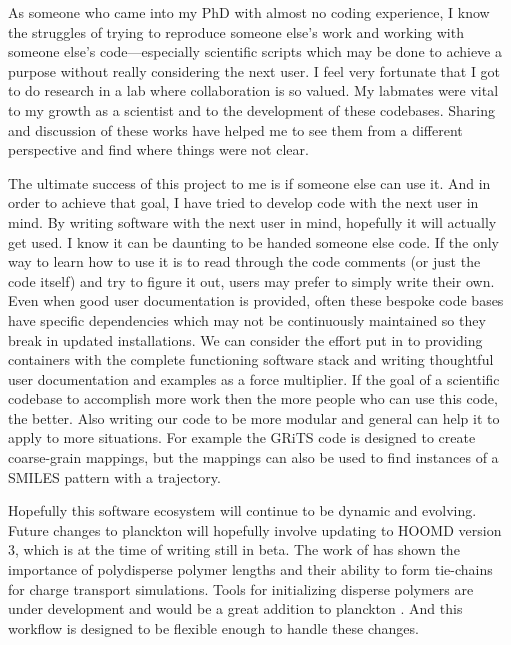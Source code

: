As someone who came into my PhD with almost no coding experience, I know the struggles of trying to reproduce someone else's work and working with someone else's code---especially scientific scripts which may be done to achieve a purpose without really considering the next user. I feel very fortunate that I got to do research in a lab where collaboration is so valued. My labmates were vital to my growth as a scientist and to the development of these codebases. 
Sharing and discussion of these works have helped me to see them from a different perspective and find where things were not clear.

The ultimate success of this project to me is if someone else can use it. 
And in order to achieve that goal, I have tried to develop code with the next user in mind.
By writing software with the next user in mind, hopefully it will actually get used. 
I know it can be daunting to be handed someone else code. If the only way to learn how to use it is to read through the code comments (or just the code itself) and try to figure it out, users may prefer to simply write their own. 
Even when good user documentation is provided, often these bespoke code bases have specific dependencies which may not be continuously maintained so they break in updated installations.
We can consider the effort put in to providing containers with the complete functioning software stack and writing thoughtful user documentation and examples as a force multiplier. 
If the goal of a scientific codebase to accomplish more work then the more people who can use this code, the better.
Also writing our code to be more modular and general can help it to apply to more situations. For example the GRiTS code is designed to create coarse-grain mappings, but the mappings can also be used to find instances of a SMILES pattern with a trajectory.

Hopefully this software ecosystem will continue to be dynamic and evolving. Future changes to planckton will hopefully involve updating to HOOMD version 3, which is at the time of writing still in beta. The work of \citet{Miller2018a} has shown the importance of polydisperse polymer lengths and their ability to form tie-chains for charge transport simulations. 
Tools for initializing disperse polymers are under development and would be a great addition to planckton \cite{polybinder}.
And this workflow is designed to be flexible enough to handle these changes.


